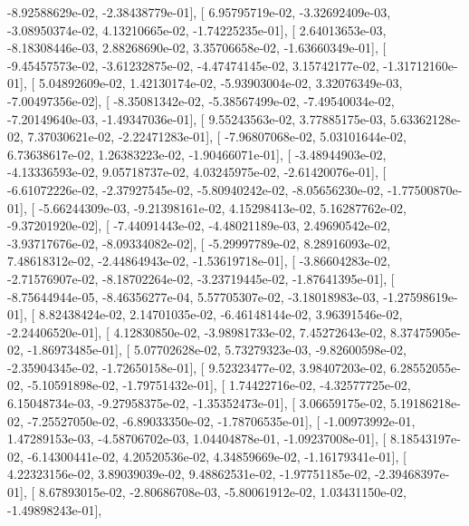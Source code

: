 \documentclass{article}
\begin{document}
         -8.92588629e-02,  -2.38438779e-01],
       [  6.95795719e-02,  -3.32692409e-03,  -3.08950374e-02,
          4.13210665e-02,  -1.74225235e-01],
       [  2.64013653e-03,  -8.18308446e-03,   2.88268690e-02,
          3.35706658e-02,  -1.63660349e-01],
       [ -9.45457573e-02,  -3.61232875e-02,  -4.47474145e-02,
          3.15742177e-02,  -1.31712160e-01],
       [  5.04892609e-02,   1.42130174e-02,  -5.93903004e-02,
          3.32076349e-03,  -7.00497356e-02],
       [ -8.35081342e-02,  -5.38567499e-02,  -7.49540034e-02,
         -7.20149640e-03,  -1.49347036e-01],
       [  9.55243563e-02,   3.77885175e-03,   5.63362128e-02,
          7.37030621e-02,  -2.22471283e-01],
       [ -7.96807068e-02,   5.03101644e-02,   6.73638617e-02,
          1.26383223e-02,  -1.90466071e-01],
       [ -3.48944903e-02,  -4.13336593e-02,   9.05718737e-02,
          4.03245975e-02,  -2.61420076e-01],
       [ -6.61072226e-02,  -2.37927545e-02,  -5.80940242e-02,
         -8.05656230e-02,  -1.77500870e-01],
       [ -5.66244309e-03,  -9.21398161e-02,   4.15298413e-02,
          5.16287762e-02,  -9.37201920e-02],
       [ -7.44091443e-02,  -4.48021189e-03,   2.49690542e-02,
         -3.93717676e-02,  -8.09334082e-02],
       [ -5.29997789e-02,   8.28916093e-02,   7.48618312e-02,
         -2.44864943e-02,  -1.53619718e-01],
       [ -3.86604283e-02,  -2.71576907e-02,  -8.18702264e-02,
         -3.23719445e-02,  -1.87641395e-01],
       [ -8.75644944e-05,  -8.46356277e-04,   5.57705307e-02,
         -3.18018983e-03,  -1.27598619e-01],
       [  8.82438424e-02,   2.14701035e-02,  -6.46148144e-02,
          3.96391546e-02,  -2.24406520e-01],
       [  4.12830850e-02,  -3.98981733e-02,   7.45272643e-02,
          8.37475905e-02,  -1.86973485e-01],
       [  5.07702628e-02,   5.73279323e-03,  -9.82600598e-02,
         -2.35904345e-02,  -1.72650158e-01],
       [  9.52323477e-02,   3.98407203e-02,   6.28552055e-02,
         -5.10591898e-02,  -1.79751432e-01],
       [  1.74422716e-02,  -4.32577725e-02,   6.15048734e-03,
         -9.27958375e-02,  -1.35352473e-01],
       [  3.06659175e-02,   5.19186218e-02,  -7.25527050e-02,
         -6.89033350e-02,  -1.78706535e-01],
       [ -1.00973992e-01,   1.47289153e-03,  -4.58706702e-03,
          1.04404878e-01,  -1.09237008e-01],
       [  8.18543197e-02,  -6.14300441e-02,   4.20520536e-02,
          4.34859669e-02,  -1.16179341e-01],
       [  4.22323156e-02,   3.89039039e-02,   9.48862531e-02,
         -1.97751185e-02,  -2.39468397e-01],
       [  8.67893015e-02,  -2.80686708e-03,  -5.80061912e-02,
          1.03431150e-02,  -1.49898243e-01],
\end{document}
